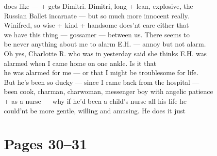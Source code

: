 \documentclass[11pt,a4paper]{article}
\begin{document}
{does like --- + gets Dimitri. Dimitri, long + lean, explosive, the \\
Russian Ballet incarnate --- but so much more innocent really. \\
Winifred, so wise + kind + handsome does'nt care either that \\
we have this thing --- \struck{\ill{}} gossamer --- between us. There seems to \\
be never anything about me to alarm E.H. --- annoy but not alarm. \\
Oh yes, Charlotte R. who was in yesterday said she thinks E.H. was \\
alarmed  when I came home on one ankle. Is it that \\
he was alarmed for me --- or that I might be troublesome for life. \\
But he's been so ducky --- since I came back from the hospital --- \\
been cook, charman, charwoman, messenger boy with angelic patience \\
+ as a nurse --- why if he'd been a child's nurse all his life he \\
could'nt be more gentle, willing and amusing. He does it just}




\section{Pages 30--31}
\end{document}
